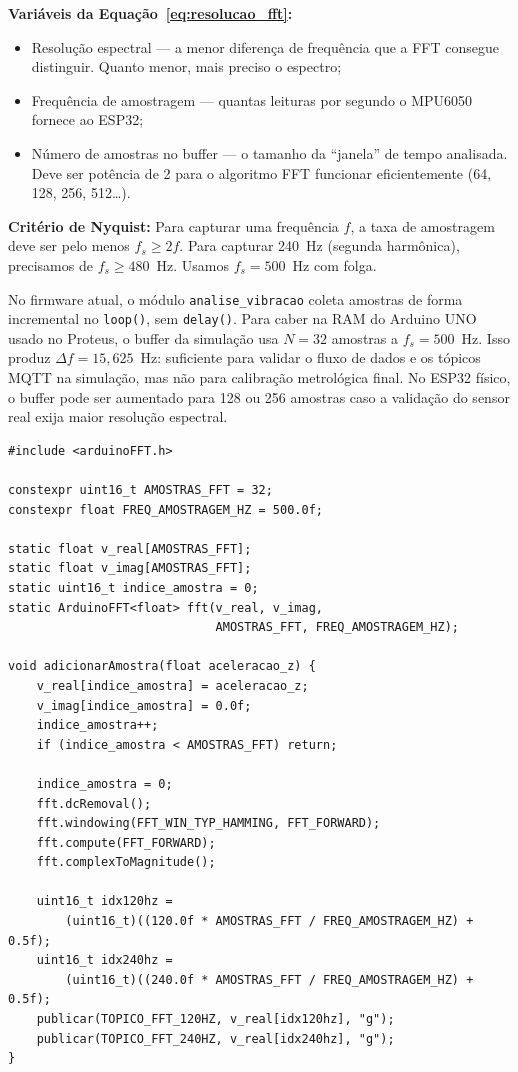 \documentclass[12pt, a4paper]{article}
\begin{document}
\noindent\textbf{Variáveis da Equação~\ref{eq:resolucao_fft}:}
\begin{itemize}[leftmargin=3cm, itemsep=2pt, topsep=4pt]
    \item[$\Delta f$ (Hz)] Resolução espectral --- a menor diferença de frequência que a FFT consegue distinguir. Quanto menor, mais preciso o espectro;
    \item[$f_s$ (Hz)]      Frequência de amostragem --- quantas leituras por segundo o MPU6050 fornece ao ESP32;
    \item[$N$]             Número de amostras no buffer --- o tamanho da ``janela'' de tempo analisada. Deve ser potência de 2 para o algoritmo FFT funcionar eficientemente (64, 128, 256, 512\ldots).
\end{itemize}

\noindent\textbf{Critério de Nyquist:} Para capturar uma frequência $f$, a taxa de amostragem deve ser pelo menos $f_s \geq 2f$. Para capturar 240~Hz (segunda harmônica), precisamos de $f_s \geq 480$~Hz. Usamos $f_s = 500$~Hz com folga.

No firmware atual, o módulo \texttt{analise\_vibracao} coleta amostras de forma incremental no \texttt{loop()}, sem \texttt{delay()}. Para caber na RAM do Arduino UNO usado no Proteus, o buffer da simulação usa $N = 32$ amostras a $f_s = 500$~Hz. Isso produz $\Delta f = 15{,}625$~Hz: suficiente para validar o fluxo de dados e os tópicos MQTT na simulação, mas não para calibração metrológica final. No ESP32 físico, o buffer pode ser aumentado para 128 ou 256 amostras caso a validação do sensor real exija maior resolução espectral.

\begin{lstlisting}[style=cpp, caption={FFT incremental sem delay()}]
#include <arduinoFFT.h>

constexpr uint16_t AMOSTRAS_FFT = 32;
constexpr float FREQ_AMOSTRAGEM_HZ = 500.0f;

static float v_real[AMOSTRAS_FFT];
static float v_imag[AMOSTRAS_FFT];
static uint16_t indice_amostra = 0;
static ArduinoFFT<float> fft(v_real, v_imag,
                             AMOSTRAS_FFT, FREQ_AMOSTRAGEM_HZ);

void adicionarAmostra(float aceleracao_z) {
    v_real[indice_amostra] = aceleracao_z;
    v_imag[indice_amostra] = 0.0f;
    indice_amostra++;
    if (indice_amostra < AMOSTRAS_FFT) return;

    indice_amostra = 0;
    fft.dcRemoval();
    fft.windowing(FFT_WIN_TYP_HAMMING, FFT_FORWARD);
    fft.compute(FFT_FORWARD);
    fft.complexToMagnitude();

    uint16_t idx120hz =
        (uint16_t)((120.0f * AMOSTRAS_FFT / FREQ_AMOSTRAGEM_HZ) + 0.5f);
    uint16_t idx240hz =
        (uint16_t)((240.0f * AMOSTRAS_FFT / FREQ_AMOSTRAGEM_HZ) + 0.5f);
    publicar(TOPICO_FFT_120HZ, v_real[idx120hz], "g");
    publicar(TOPICO_FFT_240HZ, v_real[idx240hz], "g");
}
\end{lstlisting}
\end{document}

